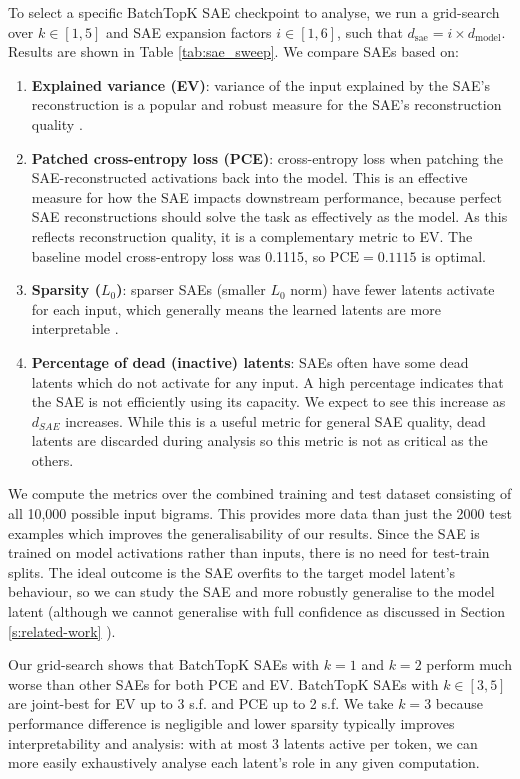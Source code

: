 To select a specific BatchTopK SAE checkpoint to analyse, we run a grid-search over $k \in [1,5]$ and SAE expansion factors $i \in [1,6]$, such that $d_\text{sae} = i \times d_\text{model}$. Results are shown in Table \ref{tab:sae_sweep}.
We compare SAEs based on:
\begin{enumerate}
    \item \textbf{Explained variance (EV)}: variance of the input explained by the SAE's reconstruction is a popular and robust measure for the SAE's reconstruction quality \cite{bussmann2024batchtopk,mcdougall2025gemmascope2}. 
    \item \textbf{Patched cross-entropy loss (PCE)}: cross-entropy loss when patching the SAE-reconstructed activations back into the model. This is an effective measure for how the SAE impacts downstream performance, because perfect SAE reconstructions should solve the task as effectively as the model. As this reflects reconstruction quality, it is a complementary metric to EV. The baseline model cross-entropy loss was 0.1115, so $\text{PCE} = 0.1115$ is optimal.
    \item \textbf{Sparsity ($L_0$)}: sparser SAEs (smaller $L_0$ norm) have fewer latents activate for each input, which generally means the learned latents are more interpretable \cite{bricken2023monosemanticity,karvonen2025saebench}.
    \item \textbf{Percentage of dead (inactive) latents}: SAEs often have some dead latents which do not activate for any input. A high percentage indicates that the SAE is not efficiently using its capacity. We expect to see this increase as $d_{SAE}$ increases. While this is a useful metric for general SAE quality, dead latents are discarded during analysis so this metric is not as critical as the others.
\end{enumerate}
We compute the metrics over the combined training and test dataset consisting of all 10,000 possible input bigrams. This provides more data than just the 2000 test examples which improves the generalisability of our results. Since the SAE is trained on model activations rather than inputs, there is no need for test-train splits. The ideal outcome is the SAE overfits to the target model latent's behaviour, so we can study the SAE and more robustly generalise to the model latent (although we cannot generalise with full confidence as discussed in Section \ref{s:related-work} \cite{chanin2024absorption,leask2025sparse}).

Our grid-search shows that BatchTopK SAEs with $k = 1$ and $k=2$ perform much worse than other SAEs for both PCE and EV. BatchTopK SAEs with $k \in [3,5]$ are joint-best for EV up to 3 s.f. and PCE up to 2 s.f. We take $k=3$ because performance difference is negligible and lower sparsity typically improves interpretability and analysis: with at most 3 latents active per token, we can more easily exhaustively analyse each latent's role in any given computation.

